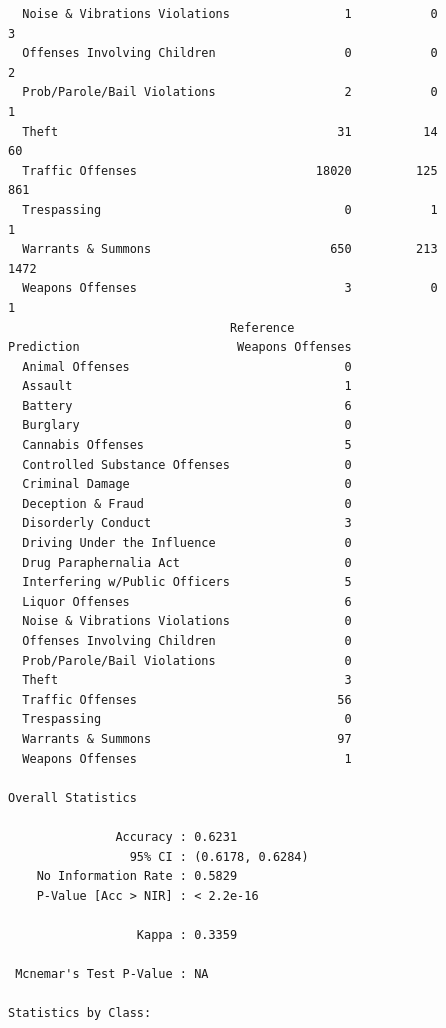 \documentclass[
  article]{jss}
\begin{document}
\begin{verbatim}
  Noise & Vibrations Violations                1           0                  3
  Offenses Involving Children                  0           0                  2
  Prob/Parole/Bail Violations                  2           0                  1
  Theft                                       31          14                 60
  Traffic Offenses                         18020         125                861
  Trespassing                                  0           1                  1
  Warrants & Summons                         650         213               1472
  Weapons Offenses                             3           0                  1
                               Reference
Prediction                      Weapons Offenses
  Animal Offenses                              0
  Assault                                      1
  Battery                                      6
  Burglary                                     0
  Cannabis Offenses                            5
  Controlled Substance Offenses                0
  Criminal Damage                              0
  Deception & Fraud                            0
  Disorderly Conduct                           3
  Driving Under the Influence                  0
  Drug Paraphernalia Act                       0
  Interfering w/Public Officers                5
  Liquor Offenses                              6
  Noise & Vibrations Violations                0
  Offenses Involving Children                  0
  Prob/Parole/Bail Violations                  0
  Theft                                        3
  Traffic Offenses                            56
  Trespassing                                  0
  Warrants & Summons                          97
  Weapons Offenses                             1

Overall Statistics
                                          
               Accuracy : 0.6231          
                 95% CI : (0.6178, 0.6284)
    No Information Rate : 0.5829          
    P-Value [Acc > NIR] : < 2.2e-16       
                                          
                  Kappa : 0.3359          
                                          
 Mcnemar's Test P-Value : NA              

Statistics by Class:


\end{verbatim}
\end{document}
